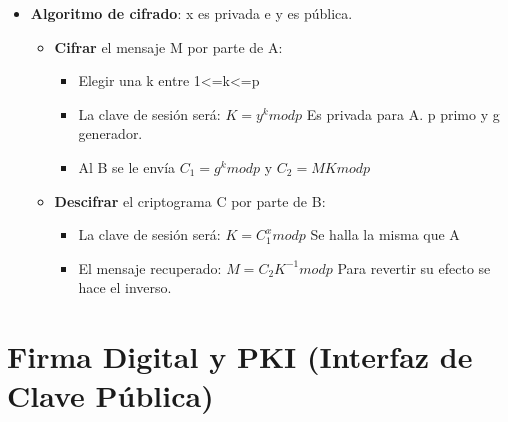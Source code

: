 \documentclass[12pt, twoside, openright]{report} %
\begin{document}
  \begin{itemize}
  \item \textbf{Algoritmo de cifrado}: x es privada e y es pública.
    

    \begin{itemize}
    \item \textbf{Cifrar} el mensaje M por parte de A:
      

      \begin{itemize}
      \item Elegir una k entre 1\textless=k\textless=p
        
      \item La clave de sesión será: $K=y^k mod p$ Es privada para A. p
        primo y g generador.
        
      \item Al B se le envía $C_1 = g^k mod p$ y $C_2 = M K mod p$
        
      \end{itemize}
    \item \textbf{Descifrar} el criptograma C por parte de B:
      

      \begin{itemize}
      \item La clave de sesión será: $K=C_1^x mod p$ Se halla la misma que A
        
      \item El mensaje recuperado: $M=C_2 K^{-1} mod p$ Para revertir su
        efecto se hace el inverso.
        
      \end{itemize}
    \end{itemize}
  \end{itemize}
  
  \section{Firma Digital y PKI (Interfaz de Clave Pública)}
  
\end{document}
